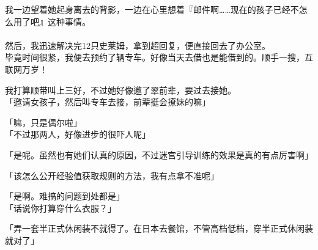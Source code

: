 我一边望着她起身离去的背影，一边在心里想着『邮件啊……现在的孩子已经不怎么用了吧』这种事情。\\

\sqsplit\\

然后，我迅速解决完12只史莱姆，拿到超回复，便直接回去了办公室。\\

毕竟时间很紧，我便去预约了辆专车。好像当天去借也是能借到的。顺手一搜，互联网万岁！

我打算顺带叫上三好，不过她好像邀了翠前辈，要过去接她。\\

「邀请女孩子，然后叫专车去接，前辈挺会撩妹的嘛」

「嘛，只是偶尔啦」\\

「不过那两人，好像进步的很吓人呢」

「是呢。虽然也有她们认真的原因，不过迷宫引导训练的效果是真的有点厉害啊」

「该怎么公开经验值获取规则的方法，我有点拿不准呢」

「是啊。难搞的问题到处都是」\\

「话说你打算穿什么衣服？」

「弄一套半正式休闲装不就得了。在日本去餐馆，不管高档低档，穿半正式休闲装就对了」

